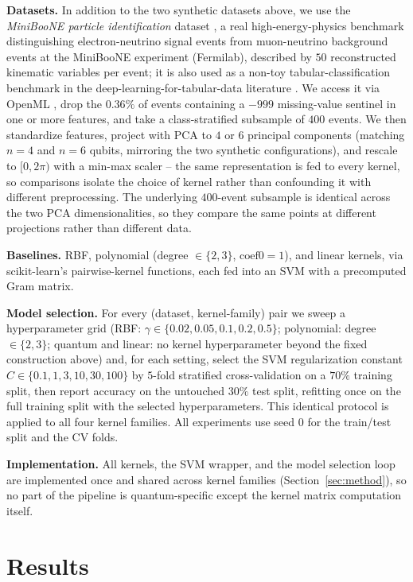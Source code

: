 \documentclass{article}
\begin{document}
\textbf{Datasets.} In addition to the two synthetic datasets above, we use
the \emph{MiniBooNE particle identification} dataset
\citep{roe2010miniboone}, a real high-energy-physics benchmark distinguishing
electron-neutrino signal events from muon-neutrino background events at the
MiniBooNE experiment (Fermilab), described by $50$ reconstructed kinematic
variables per event; it is also used as a non-toy tabular-classification
benchmark in the deep-learning-for-tabular-data literature
\citep{gorishniy2021revisiting}. We access it via OpenML
\citep{pedregosa2011scikit}, drop the $0.36\%$ of events containing a
$-999$ missing-value sentinel in one or more features, and take a
class-stratified subsample of $400$ events. We then standardize features,
project with PCA to $4$ or $6$ principal components (matching $n=4$ and
$n=6$ qubits, mirroring the two synthetic configurations), and rescale to
$[0, 2\pi)$ with a min-max scaler -- the same representation is fed to
every kernel, so comparisons isolate the choice of kernel rather than
confounding it with different preprocessing. The underlying $400$-event
subsample is identical across the two PCA dimensionalities, so they compare
the same points at different projections rather than different data.

\textbf{Baselines.} RBF, polynomial (degree $\in \{2,3\}$, $\mathrm{coef0}=1$),
and linear kernels, via scikit-learn's pairwise-kernel functions, each fed
into an SVM with a precomputed Gram matrix.

\textbf{Model selection.} For every (dataset, kernel-family) pair we sweep a
hyperparameter grid (RBF: $\gamma \in \{0.02, 0.05, 0.1, 0.2, 0.5\}$;
polynomial: degree $\in \{2,3\}$; quantum and linear: no kernel
hyperparameter beyond the fixed construction above) and, for each setting,
select the SVM regularization constant $C \in \{0.1, 1, 3, 10, 30, 100\}$ by
$5$-fold stratified cross-validation on a $70\%$ training split, then report
accuracy on the untouched $30\%$ test split, refitting once on the full
training split with the selected hyperparameters. This identical protocol is
applied to all four kernel families. All experiments use seed $0$ for the
train/test split and the CV folds.

\textbf{Implementation.} All kernels, the SVM wrapper, and the model
selection loop are implemented once and shared across kernel families
(Section~\ref{sec:method}), so no part of the pipeline is quantum-specific
except the kernel matrix computation itself.

\section{Results}
\label{sec:results}
\end{document}
